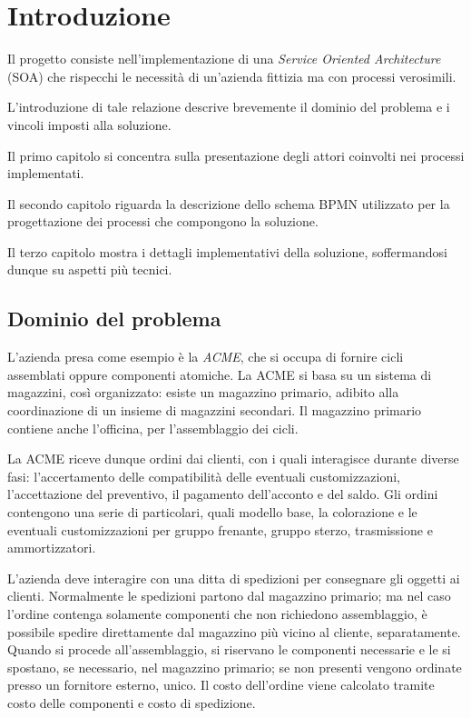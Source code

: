 \section*{Introduzione}
Il progetto consiste nell'implementazione di una \textit{Service
Oriented Architecture} (SOA) che rispecchi le necessit\`a di un'azienda
fittizia ma con processi verosimili.

L'introduzione di tale relazione descrive brevemente il dominio del
problema e i vincoli imposti alla soluzione.

Il primo capitolo si concentra sulla presentazione degli attori
coinvolti nei processi implementati.

Il secondo capitolo riguarda la descrizione dello schema BPMN utilizzato
per la progettazione dei processi che compongono la soluzione.

Il terzo capitolo mostra i dettagli implementativi della soluzione,
soffermandosi dunque su aspetti pi\`u tecnici.

\subsection*{Dominio del problema}
L'azienda presa come esempio \`e la \textit{ACME}, che si occupa di
fornire cicli assemblati oppure componenti atomiche.
La ACME si basa su un sistema di magazzini, cos\`i organizzato: esiste
un magazzino primario, adibito alla coordinazione di un insieme di
magazzini secondari. Il magazzino primario contiene anche l'officina,
per l'assemblaggio dei cicli.

La ACME riceve dunque ordini dai clienti, con i quali interagisce
durante diverse fasi: l'accertamento delle compatibilit\`a delle
eventuali customizzazioni, l'accettazione del preventivo, il pagamento
dell'acconto e del saldo. Gli ordini contengono una serie di
particolari, quali modello base, la colorazione e le eventuali
customizzazioni per gruppo frenante, gruppo sterzo, trasmissione e
ammortizzatori.

L'azienda deve interagire con una ditta di spedizioni per consegnare gli
oggetti ai clienti.
Normalmente le spedizioni partono dal magazzino primario; ma nel caso
l'ordine contenga solamente componenti che non richiedono assemblaggio,
\`e possibile spedire direttamente dal magazzino pi\`u vicino al
cliente, separatamente.
Quando si procede all'assemblaggio, si riservano le componenti
necessarie e le si spostano, se necessario, nel magazzino primario;
se non presenti vengono ordinate presso un fornitore esterno, unico.
Il costo dell'ordine viene calcolato tramite costo delle componenti e
costo di spedizione.

